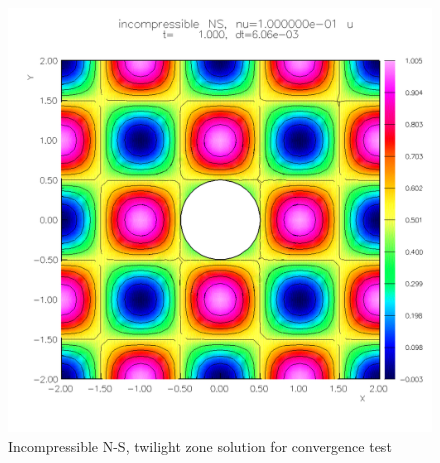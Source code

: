 \documentclass[10pt]{article}
\newcommand{\obFigures}{\homeHenshaw/res/OverBlown/docFigures}  %
\begin{document}
\begin{figure}[htb]
  \begin{center}
  \includegraphics[width=.7\linewidth]{./fig/ins_cic3_tz}
  \caption{Incompressible N-S, twilight zone solution for convergence test} \label{fig:ins.cic.tz}
  \end{center}
\end{figure}

\clearpage



\clearpage


% 


\vfill\eject




\printindex
\end{document}
